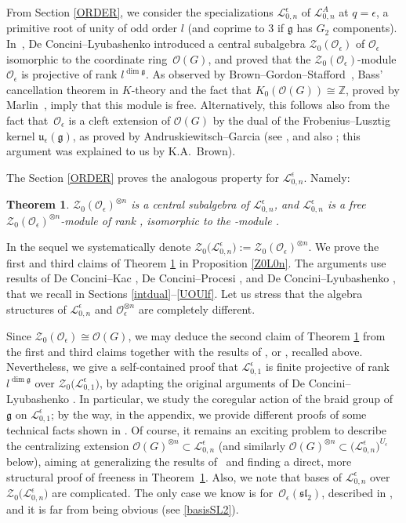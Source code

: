 \documentclass[pdftex]{sigma}
\numberwithin{equation}{section}
\newtheorem{teo}{Theorem}[section]
\theoremstyle{definition}
\newcommand{\e}{\epsilon}
\newcommand{\mz}{\mathbb{Z}}
\newcommand{\Ll}{{\mathcal L}}
\newcommand{\Oo}{{\mathcal O}}
\begin{document}
From Section \ref{ORDER}, we consider the specializations $\Ll_{0,n}^\e$ of $\Ll_{0,n}^A$ at $q=\e$, a primitive root of unity of odd order $l$ (and coprime to $3$ if $\mathfrak{g}$ has $G_2$ components). In~\cite{DC-L}, De Concini--Lyubashenko introduced a central subalgebra $\mathcal{Z}_0(\Oo_\e)$ of $\Oo_\e$ isomorphic to the coordinate ring~$\Oo(G)$, and proved that the $\mathcal{Z}_0(\Oo_\e)$-module $\Oo_\e$ is projective of rank $l^{\dim \mathfrak{g}}$. As observed by Brown--Gordon--Stafford~\cite{BGS}, Bass' cancellation theorem in $K$-theory and the fact that $K_0(\Oo(G))\cong \mz$, proved by Marlin~\cite{Marlin}, imply that this module is free. Alternatively, this follows also from the fact that~$\Oo_\e$ is a cleft extension of $\Oo(G)$ by the dual of the Frobenius--Lusztig kernel $\mathfrak{u}_\e(\mathfrak{g})$, as proved by Andruskiewitsch--Garcia (see \cite[Remark~2.18\,(b)]{AnGa}, and also \cite[Section~3.2]{BC}; this argument was explained to us by K.A.~Brown).


The Section \ref{ORDER} proves the analogous property for $\Ll_{0,n}^\e$. Namely:
\begin{teo}\label{Llibre} $\mathcal{Z}_0(\Oo_\e)^{\otimes n}$ is a central subalgebra of $\Ll_{0,n}^\e$, and $\Ll_{0,n}^\e$ is a free $\mathcal{Z}_0(\Oo_\e)^{\otimes n}$-module of rank , isomorphic to the \smash{$\mathcal{Z}_0(\Oo_\e)^{\otimes n}$}-module \smash{$\Oo_\e^{\otimes n}$}.
\end{teo}
In the sequel we systematically denote $\mathcal{Z}_0\bigl(\Ll_{0,n}^\e\bigr):= \mathcal{Z}_0(\Oo_\e)^{\otimes n}$.
We prove the first and third claims of Theorem \ref{Llibre} in Proposition \ref{Z0L0n}. The arguments use results of De Concini--Kac \cite{DC-K}, De Concini--Procesi \cite{DC-K-P1,DC-K-P2}, and De Concini--Lyubashenko \cite{DC-L}, that we recall in Sections \ref{intdual}--\ref{UOUlf}. Let us stress that the algebra structures of $\Ll_{0,n}^\e$ and $\Oo_\e^{\otimes n}$ are completely different.

Since $\mathcal{Z}_0(\Oo_\e)\cong \Oo(G)$, we may deduce the second claim of Theorem \ref{Llibre} from the first and third claims together with the results of \cite{DC-L,Marlin}, or \cite{AnGa}, recalled above. Nevertheless, we give a self-contained proof that $\Ll_{0,1}^\e$ is finite projective of rank $l^{\dim \mathfrak{g}}$ over $\mathcal{Z}_0\bigl(\Ll_{0,1}^\e\bigr)$, by adapting the original arguments of De Concini--Lyubashenko \cite[Theorem~7.2]{DC-L}. In particular, we study the coregular action of the braid group of $\mathfrak{g}$ on $\Ll_{0,1}^\e$; by the way, in the appendix, we provide different proofs of some technical facts shown in \cite{DC-L}. Of course, it remains an exciting problem to describe the centralizing extension $\mathcal{O}(G)^{\otimes n} \subset \Ll_{0,n}^\e$ (and similarly $\mathcal{O}(G)^{\otimes n} \subset \bigl(\Ll_{0,n}^\e\bigr)^{U_\e}$ below), aiming at generalizing the results of~\cite{AnGa} and finding a direct, more structural proof of freeness in Theorem~\ref{Llibre}.
Also, we note that bases of $\Ll_{0,n}^\e$ over $\mathcal{Z}_0\bigl(\Ll_{0,n}^\e\bigr)$ are complicated. The only case we know is for~$\Oo_\e({\mathfrak{sl}_2})$, described in \cite{DRZ}, and it is far from being obvious (see \eqref{basisSL2}).
\end{document}
